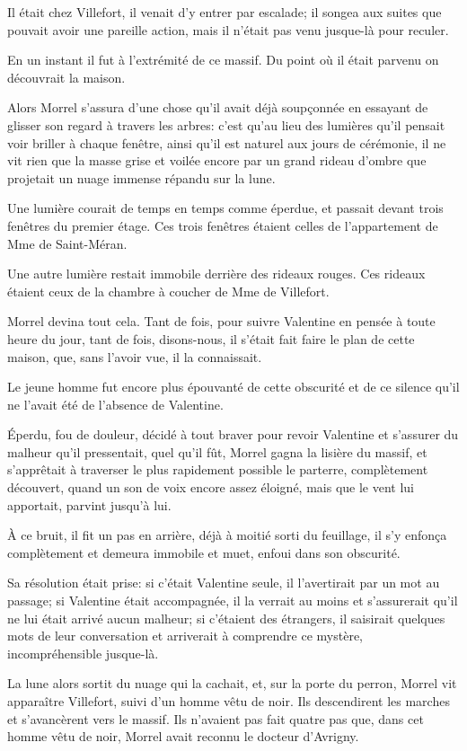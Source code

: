 Il était chez Villefort, il venait d'y entrer par escalade; il songea aux suites que pouvait avoir une pareille action, mais il n'était pas venu jusque-là pour reculer. 

En un instant il fut à l'extrémité de ce massif. Du point où il était parvenu on découvrait la maison. 

Alors Morrel s'assura d'une chose qu'il avait déjà soupçonnée en essayant de glisser son regard à travers les arbres: c'est qu'au lieu des lumières qu'il pensait voir briller à chaque fenêtre, ainsi qu'il est naturel aux jours de cérémonie, il ne vit rien que la masse grise et voilée encore par un grand rideau d'ombre que projetait un nuage immense répandu sur la lune. 

Une lumière courait de temps en temps comme éperdue, et passait devant trois fenêtres du premier étage. Ces trois fenêtres étaient celles de l'appartement de Mme de Saint-Méran. 

Une autre lumière restait immobile derrière des rideaux rouges. Ces rideaux étaient ceux de la chambre à coucher de Mme de Villefort. 

Morrel devina tout cela. Tant de fois, pour suivre Valentine en pensée à toute heure du jour, tant de fois, disons-nous, il s'était fait faire le plan de cette maison, que, sans l'avoir vue, il la connaissait. 

Le jeune homme fut encore plus épouvanté de cette obscurité et de ce silence qu'il ne l'avait été de l'absence de Valentine. 

Éperdu, fou de douleur, décidé à tout braver pour revoir Valentine et s'assurer du malheur qu'il pressentait, quel qu'il fût, Morrel gagna la lisière du massif, et s'apprêtait à traverser le plus rapidement possible le parterre, complètement découvert, quand un son de voix encore assez éloigné, mais que le vent lui apportait, parvint jusqu'à lui. 

À ce bruit, il fit un pas en arrière, déjà à moitié sorti du feuillage, il s'y enfonça complètement et demeura immobile et muet, enfoui dans son obscurité. 

Sa résolution était prise: si c'était Valentine seule, il l'avertirait par un mot au passage; si Valentine était accompagnée, il la verrait au moins et s'assurerait qu'il ne lui était arrivé aucun malheur; si c'étaient des étrangers, il saisirait quelques mots de leur conversation et arriverait à comprendre ce mystère, incompréhensible jusque-là. 

La lune alors sortit du nuage qui la cachait, et, sur la porte du perron, Morrel vit apparaître Villefort, suivi d'un homme vêtu de noir. Ils descendirent les marches et s'avancèrent vers le massif. Ils n'avaient pas fait quatre pas que, dans cet homme vêtu de noir, Morrel avait reconnu le docteur d'Avrigny. 

